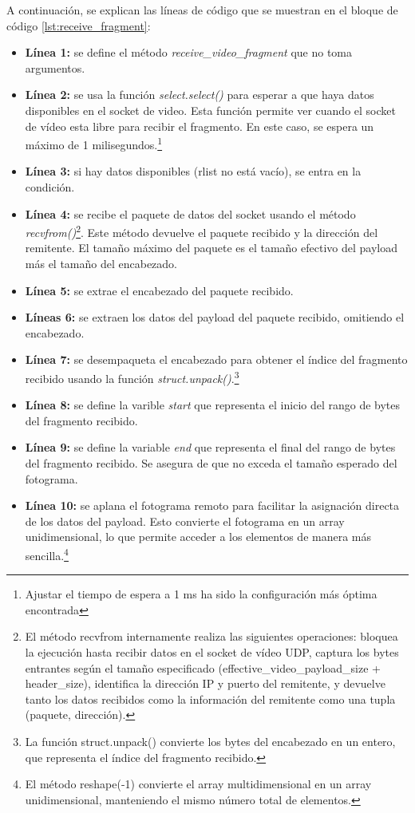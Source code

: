 A continuación, se explican las líneas de código que se muestran en el bloque de código \ref{lst:receive_fragment}:
\begin{itemize}
    \item \textbf{Línea 1:} se define el método \textit{receive\_video\_fragment} que no toma argumentos.
    \item \textbf{Línea 2:} se usa la función \textit{select.select()} para esperar a que haya datos disponibles en el socket de video. Esta función permite ver cuando el socket de vídeo esta libre para recibir el fragmento. En este caso, se espera un máximo de 1 milisegundos.\footnote{Ajustar el tiempo de espera a 1 ms ha sido la configuración más óptima encontrada}
    \item \textbf{Línea 3:} si hay datos disponibles (rlist no está vacío), se entra en la condición.
    \item \textbf{Línea 4:} se recibe el paquete de datos del socket usando el método \textit{recvfrom()}\footnote{El método recvfrom internamente realiza las siguientes operaciones: bloquea la ejecución hasta recibir datos en el socket de vídeo UDP, captura los bytes entrantes según el tamaño especificado (effective\_video\_payload\_size + header\_size), identifica la dirección IP y puerto del remitente, y devuelve tanto los datos recibidos como la información del remitente como una tupla (paquete, dirección).}. Este método devuelve el paquete recibido y la dirección del remitente. El tamaño máximo del paquete es el tamaño efectivo del payload más el tamaño del encabezado.
    \item \textbf{Línea 5:} se extrae el encabezado del paquete recibido.
    \item \textbf{Líneas 6:} se extraen los datos del payload del paquete recibido, omitiendo el encabezado.
    \item \textbf{Línea 7:} se desempaqueta el encabezado para obtener el índice del fragmento recibido usando la función \textit{struct.unpack()}.\footnote{La función struct.unpack() convierte los bytes del encabezado en un entero, que representa el índice del fragmento recibido.}
    \item \textbf{Línea 8:} se define la varible \textit{start} que representa el inicio del rango de bytes del fragmento recibido.
    \item \textbf{Línea 9:} se define la variable \textit{end} que representa el final del rango de bytes del fragmento recibido. Se asegura de que no exceda el tamaño esperado del fotograma.
    \item \textbf{Línea 10:} se aplana el fotograma remoto para facilitar la asignación directa de los datos del payload. Esto convierte el fotograma en un array unidimensional, lo que permite acceder a los elementos de manera más sencilla.\footnote{El método reshape(-1) convierte el array multidimensional en un array unidimensional, manteniendo el mismo número total de elementos.}

\end{itemize}

